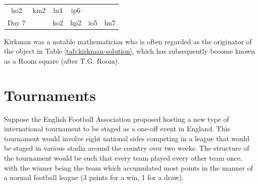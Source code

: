\documentclass[
  11pt,
  a4paper]{book}
\begin{document}
\begin{longtable}[]{@{}cccccc@{}}
\begin{minipage}[t]{0.07\columnwidth}
ho2\strut
\end{minipage} & \begin{minipage}[t]{0.07\columnwidth}\centering
km2\strut
\end{minipage} & \begin{minipage}[t]{0.07\columnwidth}\centering
ln4\strut
\end{minipage} & \begin{minipage}[t]{0.07\columnwidth}\centering
ip6\strut
\end{minipage}\tabularnewline
\begin{minipage}[t]{0.09\columnwidth}\centering
Day 7\strut
\end{minipage} & \begin{minipage}[t]{0.07\columnwidth}\centering
346\strut
\end{minipage} & \begin{minipage}[t]{0.07\columnwidth}\centering
ko2\strut
\end{minipage} & \begin{minipage}[t]{0.07\columnwidth}\centering
hp2\strut
\end{minipage} & \begin{minipage}[t]{0.07\columnwidth}\centering
io5\strut
\end{minipage} & \begin{minipage}[t]{0.07\columnwidth}\centering
lm7\strut
\end{minipage}\tabularnewline
\bottomrule
\end{longtable}

Kirkman was a notable mathematician who is often regarded as the
originator of the object in Table
\ref{tab:kirkman-solution},
which has subsequently become known as a Room square (after T.G. Room).

\hypertarget{tournaments}{%
\section{Tournaments}\label{tournaments}}

Suppose the English Football Association proposed hosting a new type of
international tournament to be staged as a one-off event in England.
This tournament would involve eight national sides competing in a league
that would be staged in various stadia around the country over two
weeks. The structure of the tournament would be such that every team
played every other team once, with the winner being the team which
accumulated most points in the manner of a normal football league (3
points for a win, 1 for a draw).
\end{document}
